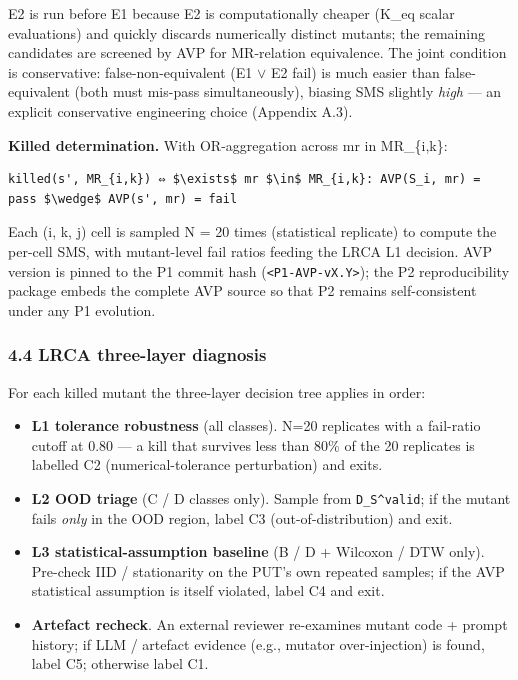 \documentclass[review,12pt,authoryear]{elsarticle}
\providecommand{\tightlist}{\setlength{\itemsep}{0pt}\setlength{\parskip}{0pt}}
\begin{document}
E2 is run before E1 because E2 is computationally cheaper (K\_eq scalar
evaluations) and quickly discards numerically distinct mutants; the
remaining candidates are screened by AVP for MR-relation equivalence.
The joint condition is conservative: false-non-equivalent (E1 $\vee$ E2 fail)
is much easier than false-equivalent (both must mis-pass
simultaneously), biasing SMS slightly \emph{high} --- an explicit
conservative engineering choice (Appendix A.3).

\textbf{Killed determination.} With OR-aggregation across mr in
MR\_\{i,k\}:

\begin{verbatim}
killed(s', MR_{i,k}) ⇔ $\exists$ mr $\in$ MR_{i,k}: AVP(S_i, mr) = pass $\wedge$ AVP(s', mr) = fail
\end{verbatim}

Each (i, k, j) cell is sampled N = 20 times (statistical replicate) to
compute the per-cell SMS, with mutant-level fail ratios feeding the LRCA
L1 decision. AVP version is pinned to the P1 commit hash
(\texttt{\textless{}P1-AVP-vX.Y\textgreater{}}); the P2 reproducibility
package embeds the complete AVP source so that P2 remains
self-consistent under any P1 evolution.

\subsubsection{4.4 LRCA three-layer
diagnosis}\label{lrca-three-layer-diagnosis}

For each killed mutant the three-layer decision tree applies in order:

\begin{itemize}
\tightlist
\item
  \textbf{L1 tolerance robustness} (all classes). N=20 replicates with a
  fail-ratio cutoff at 0.80 --- a kill that survives less than 80\% of
  the 20 replicates is labelled C2 (numerical-tolerance perturbation)
  and exits.
\item
  \textbf{L2 OOD triage} (C / D classes only). Sample from
  \texttt{D\_S\^{}valid}; if the mutant fails \emph{only} in the OOD
  region, label C3 (out-of-distribution) and exit.
\item
  \textbf{L3 statistical-assumption baseline} (B / D + Wilcoxon / DTW
  only). Pre-check IID / stationarity on the PUT's own repeated samples;
  if the AVP statistical assumption is itself violated, label C4 and
  exit.
\item
  \textbf{Artefact recheck}. An external reviewer re-examines mutant
  code + prompt history; if LLM / artefact evidence (e.g., mutator
  over-injection) is found, label C5; otherwise label C1.
\end{itemize}
\end{document}
